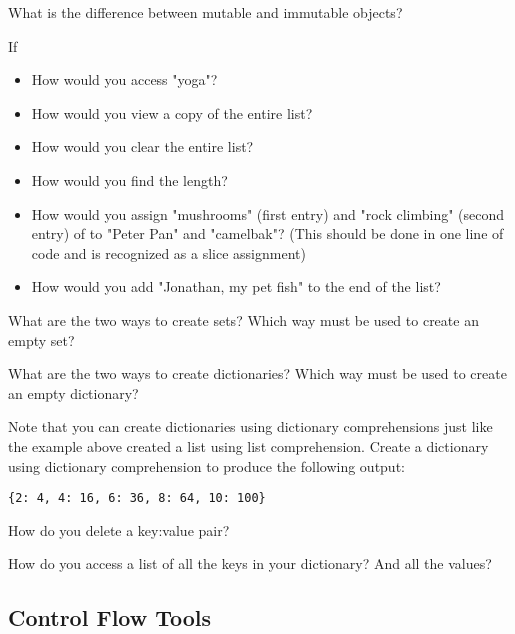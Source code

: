 \begin{problem}
\item What is the difference between mutable and immutable objects?
\item If 
\begin{itemize}
	\item How would you access "yoga"? 
	\item How would you view a copy of the entire list?
	\item How would you clear the entire list? 
	\item How would you find the length? 
	\item How would you assign "mushrooms" (first entry) and "rock climbing" (second entry) 
	of  to "Peter Pan" and "camelbak"? 
	(This should be done in one line of code and is recognized as a slice assignment)
	\item How would you add "Jonathan, my pet fish" to the end of the list?
\end{itemize}
\item What are the two ways to create sets? Which way must be used to 
create an empty set?
\item What are the two ways to create dictionaries? Which way must be used to
create an empty dictionary?
\item Note that you can create dictionaries using dictionary comprehensions
just like the example above created a list using list comprehension.
Create a dictionary using dictionary comprehension to produce the following output:
\begin{lstlisting}
{2: 4, 4: 16, 6: 36, 8: 64, 10: 100}
\end{lstlisting}
\item How do you delete a key:value pair?
\item How do you access a list of all the keys in your dictionary? And all the values?


\end{problem}


\subsection*{Control Flow Tools}

